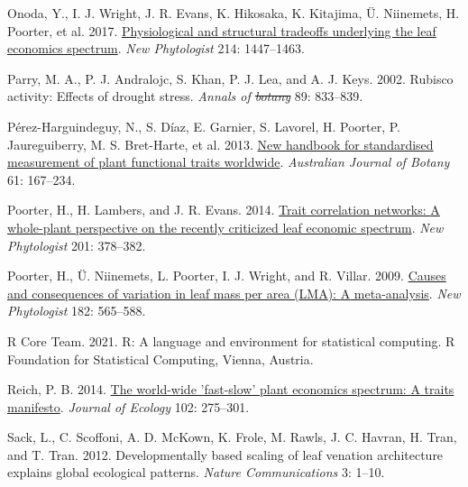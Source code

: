 \documentclass[
  12pt,
  a4paper,
,tablecaptionabove
]{scrartcl}
\newlength{\cslhangindent}
\newenvironment{CSLReferences}[2] %
 {%
  \setlength{\parindent}{0pt}
  \ifodd #1 \everypar{\setlength{\hangindent}{\cslhangindent}}\ignorespaces\fi
  \ifnum #2 > 0
  \setlength{\parskip}{#2\baselineskip}
  \fi
 }%
 {}
\providecommand{\DIFaddtex}[1]{{\protect\color{blue}\uwave{#1}}} %
\providecommand{\DIFdeltex}[1]{{\protect\color{red}\sout{#1}}}                      %
\providecommand{\DIFaddbegin}{} %
\providecommand{\DIFaddend}{} %
\providecommand{\DIFdelbegin}{} %
\providecommand{\DIFdelend}{} %
\providecommand{\DIFadd}[1]{\texorpdfstring{\DIFaddtex{#1}}{#1}} %
\providecommand{\DIFdel}[1]{\texorpdfstring{\DIFdeltex{#1}}{}} %
\newcommand{\DIFscaledelfig}{0.5}
\newlength{\DIFdelgraphicswidth} %
\newlength{\DIFdelgraphicsheight} %
\newcommand{\DIFaddincludegraphics}[2][]{{\color{blue}\fbox{\DIFOincludegraphics[#1]{#2}}}} %
\newcommand{\DIFdelincludegraphics}[2][]{%
\sbox{\DIFdelgraphicsbox}{\DIFOincludegraphics[#1]{#2}}%
\settoboxwidth{\DIFdelgraphicswidth}{\DIFdelgraphicsbox} %
\settoboxtotalheight{\DIFdelgraphicsheight}{\DIFdelgraphicsbox} %
\scalebox{\DIFscaledelfig}{%
\parbox[b]{\DIFdelgraphicswidth}{\usebox{\DIFdelgraphicsbox}\\[-\baselineskip] \rule{\DIFdelgraphicswidth}{0em}}\llap{\resizebox{\DIFdelgraphicswidth}{\DIFdelgraphicsheight}{%
\setlength{\unitlength}{\DIFdelgraphicswidth}%
\begin{picture}(1,1)%
\thicklines\linethickness{2pt} %
{\color[rgb]{1,0,0}\put(0,0){\framebox(1,1){}}}%
{\color[rgb]{1,0,0}\put(0,0){\line( 1,1){1}}}%
{\color[rgb]{1,0,0}\put(0,1){\line(1,-1){1}}}%
\end{picture}%
}\hspace*{3pt}}} %
} %
\DeclareRobustCommand{\DIFaddbegin}{\DIFOaddbegin \let\includegraphics\DIFaddincludegraphics} %
\DeclareRobustCommand{\DIFaddend}{\DIFOaddend \let\includegraphics\DIFOincludegraphics} %
\DeclareRobustCommand{\DIFdelbegin}{\DIFOdelbegin \let\includegraphics\DIFdelincludegraphics} %
\DeclareRobustCommand{\DIFdelend}{\DIFOaddend \let\includegraphics\DIFOincludegraphics} %
\begin{document}
\begin{CSLReferences}{1}{0}
\leavevmode{}%
Onoda, Y., I. J. Wright, J. R. Evans, K. Hikosaka, K. Kitajima, Ü.
Niinemets, H. Poorter, et al. 2017.
\href{https://doi.org/10.1111/nph.14496}{Physiological and structural
tradeoffs underlying the leaf economics spectrum}. \emph{New
Phytologist} 214: 1447--1463.

\leavevmode{}%
Parry, M. A., P. J. Andralojc, S. Khan, P. J. Lea, and A. J. Keys. 2002.
Rubisco activity: Effects of drought stress. \emph{Annals of \DIFdelbegin \DIFdel{botany}\DIFdelend \DIFaddbegin \DIFadd{Botany}\DIFaddend } 89:
833--839.

\leavevmode{}%
Pérez-Harguindeguy, N., S. Díaz, E. Garnier, S. Lavorel, H. Poorter, P.
Jaureguiberry, M. S. Bret-Harte, et al. 2013.
\href{https://doi.org/10.1071/BT12225}{New handbook for standardised
measurement of plant functional traits worldwide}. \emph{Australian
Journal of Botany} 61: 167--234.

\leavevmode{}%
Poorter, H., H. Lambers, and J. R. Evans. 2014.
\href{https://doi.org/10.1111/nph.12547}{Trait correlation networks: {A}
whole-plant perspective on the recently criticized leaf economic
spectrum}. \emph{New Phytologist} 201: 378--382.

\leavevmode{}%
Poorter, H., Ü. Niinemets, L. Poorter, I. J. Wright, and R. Villar.
2009. \href{https://doi.org/10.1111/j.1469-8137.2009.02830.x}{Causes and
consequences of variation in leaf mass per area ({LMA}): {A}
meta-analysis}. \emph{New Phytologist} 182: 565--588.

\leavevmode{}%
R Core Team. 2021. R: {A} language and environment for statistical
computing. {R Foundation for Statistical Computing}, {Vienna, Austria}.

\leavevmode{}%
Reich, P. B. 2014. \href{https://doi.org/10.1111/1365-2745.12211}{The
world-wide 'fast-slow' plant economics spectrum: {A} traits manifesto}.
\emph{Journal of Ecology} 102: 275--301.

\leavevmode{}%
Sack, L., C. Scoffoni, A. D. McKown, K. Frole, M. Rawls, J. C. Havran,
H. Tran, and T. Tran. 2012. Developmentally based scaling of leaf
venation architecture explains global ecological patterns. \emph{Nature
Communications} 3: 1--10.


\end{CSLReferences}
\end{document}
